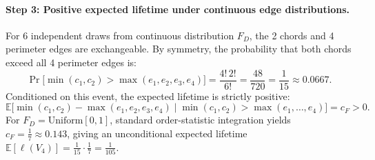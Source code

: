 \documentclass{article}
\begin{document}
\paragraph{Step 3: Positive expected lifetime under continuous edge distributions.}
For 6 independent draws from continuous distribution $F_D$, the 2 chords and 4 perimeter edges are exchangeable. By symmetry, the probability that both chords exceed all 4 perimeter edges is:
\begin{equation}
    \Pr\Big[\min(c_1, c_2) > \max(e_1, e_2, e_3, e_4)\Big] = \frac{4! \, 2!}{6!} = \frac{48}{720} = \frac{1}{15} \approx 0.0667.
\end{equation}
Conditioned on this event, the expected lifetime is strictly positive:
\begin{equation}
    \mathbb{E}\Big[\min(c_1, c_2) - \max(e_1, e_2, e_3, e_4) \;\Big|\; \min(c_1, c_2) > \max(e_1, \dots, e_4)\Big] = c_F > 0.
\end{equation}
For $F_D = \mathrm{Uniform}[0, 1]$, standard order-statistic integration yields $c_F = \frac{1}{7} \approx 0.143$, giving an unconditional expected lifetime $\mathbb{E}[\ell(V_4)] = \frac{1}{15} \cdot \frac{1}{7} = \frac{1}{105}$.
\end{document}
